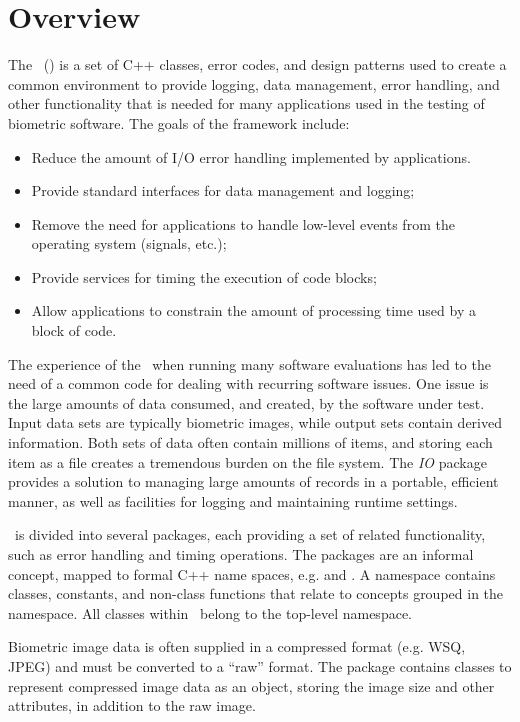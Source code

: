 \chapter{Overview}

The \lname\ (\sname)
is a set of C++\cite{cpp:plguide} classes, error codes, and design
patterns used to create a common environment to provide logging, data
management, error handling, and other functionality that is needed for many
applications used in the testing of biometric software. The goals of the
framework include:
\begin{itemize}
\item Reduce the amount of I/O error handling implemented by applications.
\item Provide standard interfaces for data management and logging;
\item Remove the need for applications to handle low-level events from the
operating system (signals, etc.);
\item Provide services for timing the execution of code blocks;
\item Allow applications to constrain the amount of processing time used
by a block of code.
\end{itemize}

The experience of the \nistig\ when running many software evaluations has led
to the need of a common code for dealing with recurring software issues. One
issue is the large amounts of data consumed, and created, by the software
under test. Input data sets are typically biometric images, while output sets
contain derived information. Both sets of data often contain millions of
items, and storing each item as a file creates a tremendous burden on the file
system. The {\em IO} package provides a solution to
managing large amounts of records in a portable, efficient manner, as well as 
facilities for logging and maintaining runtime settings.

\sname\ is divided into several packages, each providing a set of
related functionality, such as error handling and timing operations. The
packages are an informal concept, mapped to formal C++ name spaces, e.g.
 and . A namespace contains classes, constants, and 
non-class functions that relate to concepts grouped in the namespace.
All classes within \sname\ belong to the top-level 
namespace.

Biometric image data is often supplied in a compressed format (e.g. WSQ, JPEG)
and must be converted to a ``raw'' format. The  package contains
classes to represent compressed image data as an object, storing the image
size and other attributes, in addition to the raw image.

